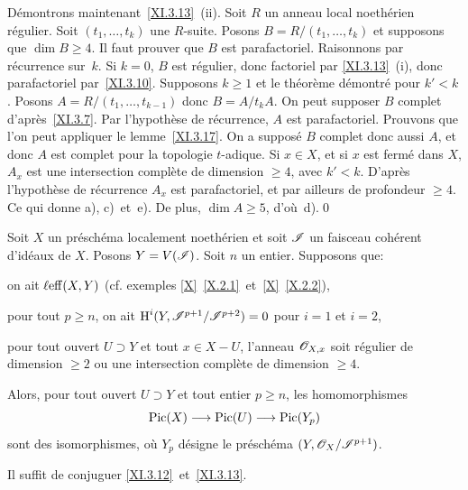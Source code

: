 D\'emontrons maintenant~\ref{XI.3.13}~(ii). Soit $R$ un anneau local noeth\'erien r\'egulier. Soit $(t_1, \ldots, t_k)$ une $R$-suite. Posons $B=R/(t_1, \ldots, t_k)$ et supposons que $\dim B\geq 4$. Il faut prouver que $B$ est parafactoriel. Raisonnons par r\'ecurrence sur~$k$. Si $k=0$, $B$ est r\'egulier, donc factoriel par \ref{XI.3.13}~(i), donc parafactoriel par~\ref{XI.3.10}. Supposons $k\geq 1$ et le th\'eor\`eme d\'emontr\'e pour $k'<k$. Posons $A=R/(t_1, \ldots, t_{k-1})$ donc $B=A/t_k A$. On peut supposer $B$ complet d'apr\`es~\ref{XI.3.7}. Par l'hypoth\`ese de r\'ecurrence, $A$ est parafactoriel. Prouvons que l'on peut appliquer le lemme~\ref{XI.3.17}. On a suppos\'e $B$ complet donc aussi $A$, et donc $A$ est complet pour la topologie $t$-adique. Si $x\in X$, et si $x$ est ferm\'e dans $X$, $A_x$ est une intersection compl\`ete de dimension $\geq 4$, avec $k'<k$. D'apr\`es l'hypoth\`ese de r\'ecurrence $A_x$ est parafactoriel, et par ailleurs de profondeur $\geq 4$. Ce qui donne a), c)~et~e). De plus, $\dim A\geq 5$, d'o\`u~d).\qed

\begin{theoreme} \label{XI.3.18}
Soit $X$ un pr\'esch\'ema localement noeth\'erien et soit ${\mathscr I}$ un faisceau coh\'erent d'id\'eaux de $X$. Posons $Y=V({\mathscr I})$. Soit $n$ un entier. Supposons que:
\begin{enumeratei}
\item
on ait $\operatorname{\ell eff}(X, Y)$ (cf. exemples \ref{X}~\ref{X.2.1}~et~\ref{X}~\ref{X.2.2}),
\item
pour tout $p\geq n$, on ait $\operatorname{H}^i(Y, {\mathscr I}^{p+1}/{\mathscr I}^{p+2})=0$ pour $i=1$ et $i=2$,
\item
pour tout ouvert $U\supset Y$ et tout $x\in X-U$, l'anneau $\mathscr{O}_{X, x}$ soit r\'egulier de dimension $\geq 2$ ou une intersection compl\`ete de dimension $\geq 4$.
\end{enumeratei}
\noindent
Alors, pour tout ouvert $U\supset Y$ et tout entier $p\geq n$, les homomorphismes
\[
\Pic(X)\to\Pic(U)\to\Pic(Y_p)
\]
sont des isomorphismes, o\`u $Y_p$ d\'esigne le pr\'esch\'ema $(Y, \mathscr{O}_X/{\mathscr I}^{p+1})$.
\end{theoreme}

Il suffit de conjuguer \ref{XI.3.12}~et~\ref{XI.3.13}.

